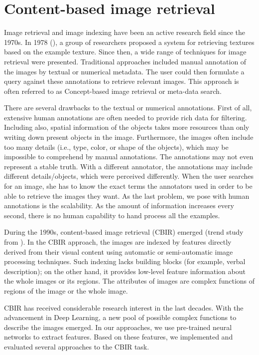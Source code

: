 \chapter{Content-based image retrieval}
\label{ch:preliminaries}

Image retrieval and image indexing have been an active research field since the 1970s. In 1978 (\cite{tamura1978textural}), a group of researchers proposed a system for retrieving textures based on the example texture. Since then, a wide range of techniques for image retrieval were presented. Traditional approaches included manual annotation of the images by textual or numerical metadata. The user could then formulate a query against these annotations to retrieve relevant images. This approach is often referred to as Concept-based image retrieval or meta-data search.

There are several drawbacks to the textual or numerical annotations. First of all, extensive human annotations are often needed to provide rich data for filtering. Including also, spatial information of the objects takes more resources than only writing down present objects in the image. Furthermore, the images often include too many details (i.e., type, color, or shape of the objects), which may be impossible to comprehend by manual annotations.  The annotations may not even represent a stable truth. With a different annotator, the annotations may include different details/objects, which were perceived differently. When the user searches for an image, she has to know the exact terms the annotators used in order to be able to retrieve the images they want. As the last problem, we pose with human annotations is the scalability. As the amount of information increases every second, there is no human capability to hand process all the examples.

During the 1990s, content-based image retrieval (CBIR) emerged (trend study from \cite{datta2008image}). In the CBIR approach, the images are indexed by features directly derived from their visual content using automatic or semi-automatic image processing techniques. Such indexing lacks building blocks (for example, verbal description); on the other hand, it provides low-level feature information about the whole images or its regions. The attributes of images are complex functions of regions of the image or the whole image.

CBIR has received considerable research interest in the last decades. With the advancement in Deep Learning, a new pool of possible complex functions to describe the images emerged. In our approaches, we use pre-trained neural networks to extract features. Based on these features, we implemented and evaluated several approaches to the CBIR task.

